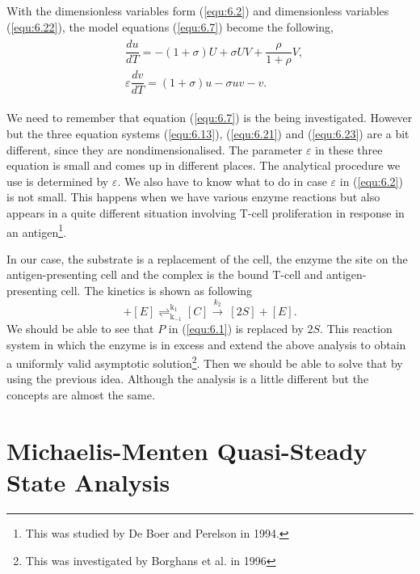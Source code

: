 \documentclass[a4paper]{report}
\theoremstyle{definition}
\begin{document}
With the dimensionless variables form (\ref{equ:6.2}) and dimensionless variables (\ref{equ:6.22}), the model equations (\ref{equ:6.7}) become the following,
\begin{align}
\label{equ:6.23}
\begin{split}
&\dfrac{du}{dT}=-(1+\sigma)U+\sigma UV+\dfrac{\rho}{1+\rho}V,
\\
&\varepsilon\dfrac{dv}{dT}=(1+\sigma)u-\sigma uv-v.
\end{split}
\end{align}


We need to remember that equation (\ref{equ:6.7}) is the being investigated. However but the three equation systems (\ref{equ:6.13}), (\ref{equ:6.21}) and (\ref{equ:6.23}) are a bit different, since they are nondimensionalised. The parameter $\varepsilon$ in these three equation is small and comes up in different places. The analytical procedure we use is determined by $\varepsilon$. We also have to know what to do in case $\varepsilon$ in (\ref{equ:6.2}) is not small. This happens when we have various enzyme reactions but also appears in a quite different situation involving T-cell proliferation in response in an antigen\footnote{This was studied by De Boer and Perelson in 1994.}.

In our case, the substrate is a replacement of the cell, the enzyme the site on the antigen-presenting cell and the complex is the bound T-cell and antigen-presenting cell. The kinetics is
shown as following
\begin{equation}
[S]+[E] \mathrel{\mathop{\rightleftharpoons}^{\mathrm{k_1}}_{\mathrm{k_{-1}}}} [C]\overset{k_2}{\longrightarrow}\ [2S]+[E].
\end{equation}
We should be able to see that $P$ in (\ref{equ:6.1}) is replaced by $2S$.
This reaction system in which the enzyme is in excess and extend the above analysis to obtain a uniformly valid asymptotic solution\footnote{This was investigated by Borghans et al. in 1996}. Then we should be able to solve that by using the previous idea. Although the analysis is a little different but the concepts are almost the same. 

\section{Michaelis-Menten Quasi-Steady State Analysis}
\end{document}

